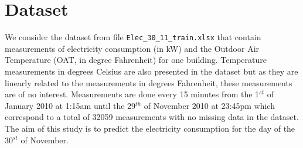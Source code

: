 \section{Dataset}
We consider the dataset from file \texttt{Elec\_30\_11\_train.xlsx} that contain measurements of 
electricity consumption (in kW) and the Outdoor Air Temperature (OAT, in degree Fahrenheit) for one 
building. Temperature measurements in degrees Celsius are also presented in the dataset but as they 
are linearly related to the measurements in degrees Fahrenheit, these measurements are of no 
interest. Measurements are done every 15 minutes from the 1$^{st}$ of January 2010 at 1:15am until 
the 29$^{th}$ of November 2010 at 23:45pm which correspond to a total of 32059 measurements with 
no missing data in the dataset. The aim of this study is to predict the electricity consumption 
for the day of the 30$^{st}$ of November.\\


